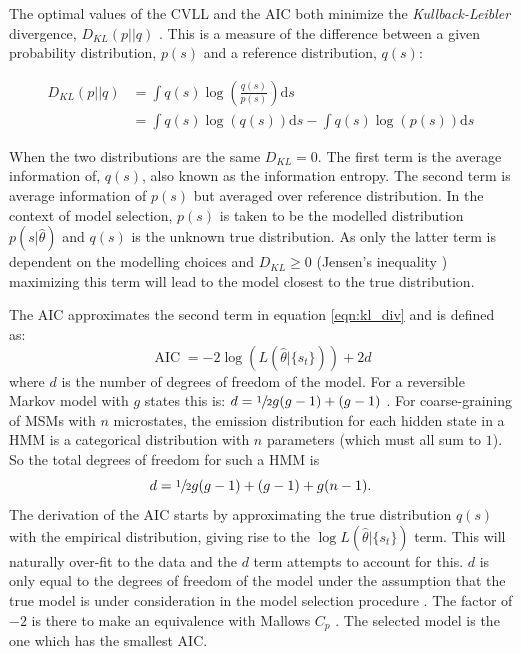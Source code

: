 The optimal values of the CVLL and the AIC both minimize the \emph{Kullback-Leibler} divergence, $D_{KL}(p||q)$ \cite{mclachlanFiniteMixtureModels2000}. This is a measure of the difference between a given probability distribution, $p(s)$ and a reference distribution, $q(s)$: 

\begin{equation}\label{eqn:kl_div}
\begin{split}
    D_{KL}\left(p||q\right) & = \int q(s) \log{\left(\frac{ q(s) }{p(s)}  \right)} \mathrm{d}s \\ 
    & = \int q(s) \log{\left(q(s)\right)}\mathrm{d}s - \int q(s)\log{\left(p(s)\right)} \mathrm{d}s
\end{split}
\end{equation}

When the two distributions are the same $D_{KL} = 0$. The first term is the average information of, $q(s)$, also known as the information entropy\cite{mackay2003information}. The second term is average information of $p(s)$ but averaged over reference distribution. In the context of model selection, $p(s)$ is taken to be the modelled distribution $p(s|\hat{\theta})$ and $q(s)$ is the unknown true distribution. As only the latter term is dependent on the modelling choices and  $D_{KL}\ge 0$ (Jensen's inequality \cite{mackay2003information}) maximizing this term will lead to the model closest to the true distribution.  

The AIC approximates the second term in equation \ref{eqn:kl_div} and is defined as\cite{mclachlanFiniteMixtureModels2000}:
\begin{equation}\label{eqn:aic}
    \operatorname{AIC} = -2\log{\left(L\left(\hat{\theta}|\{s_t\}\right)\right)} + 2d
\end{equation}
where $d$ is the number of degrees of freedom of the model. For a reversible Markov model with $g$ states this is: $d = \sfrac{1}{2}g(g-1) + (g-1)$ \cite{trendelkamp-schroerEstimationUncertaintyReversible2015b}. For coarse-graining of MSMs with $n$ microstates, the emission distribution for each hidden state in a HMM is a categorical distribution with $n$ parameters (which must all sum to $1$). So the total  degrees of freedom for such a HMM is
\begin{equation}\label{eqn:hmm_dof}
    d = \sfrac{1}{2}g(g-1) + (g-1) + g(n-1). 
\end{equation}
The derivation of the AIC starts by approximating the true distribution $q(s)$ with the empirical distribution, giving rise to the $\log{L\left(\hat{\theta}|\{s_t\} \right)}$ term.  This will naturally over-fit to the data and the $d$ term attempts to account for this. $d$ is only equal to the degrees of freedom of the model under the assumption that the true model is under consideration in the model selection procedure \cite{ripley_1996}.  The factor of $-2$ is there to make an equivalence with Mallows $C_p$ \cite{friedman2001elements}. The selected model is the one which has the smallest AIC. 

